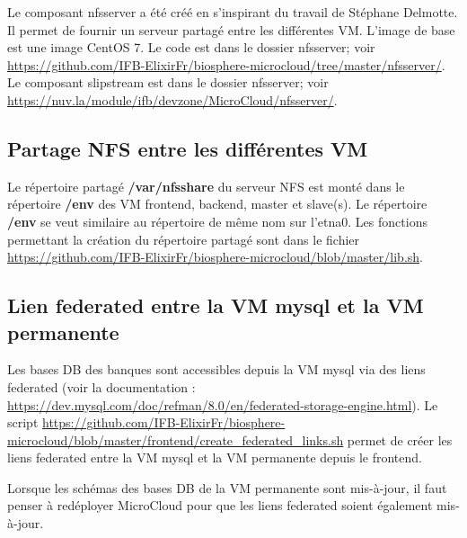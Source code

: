 Le composant nfsserver a été créé en s'inspirant du travail de Stéphane Delmotte.
Il permet de fournir un serveur partagé entre les différentes VM.
L'image de base est une image CentOS 7.
Le code est dans le dossier nfsserver; voir  \url{https://github.com/IFB-ElixirFr/biosphere-microcloud/tree/master/nfsserver/}.
Le composant slipstream est dans le dossier nfsserver; voir
\url{https://nuv.la/module/ifb/devzone/MicroCloud/nfsserver/}.

\subsection{Partage NFS entre les différentes VM}

Le répertoire partagé \textbf{/var/nfsshare} du serveur NFS est monté dans le répertoire \textbf{/env}
des VM frontend, backend, master et slave(s).
Le répertoire \textbf{/env} se veut similaire au répertoire de même nom sur l’etna0. 
Les fonctions permettant la création du répertoire partagé sont dans le fichier \url{https://github.com/IFB-ElixirFr/biosphere-microcloud/blob/master/lib.sh}.

\subsection{Lien federated entre la VM mysql et  la VM permanente}
Les bases DB des banques sont accessibles depuis la VM mysql via des liens federated (voir la documentation : \url{https://dev.mysql.com/doc/refman/8.0/en/federated-storage-engine.html}). Le script  \url{https://github.com/IFB-ElixirFr/biosphere-microcloud/blob/master/frontend/create_federated_links.sh} permet de créer les liens federated entre la VM mysql et la VM permanente depuis le frontend.\\

\begin{mycolorbox}
	Lorsque les schémas des bases DB de la VM permanente sont mis-à-jour, il faut penser à redéployer MicroCloud pour que les liens federated soient également mis-à-jour.
\end{mycolorbox}

